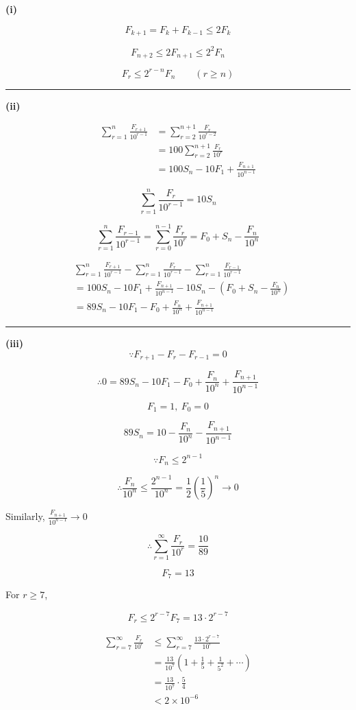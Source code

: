 \documentclass[12pt]{article}
\begin{document}
\newcommand{\ds}{\displaystyle}

\textbf{(i)}

$$F_{k+1}=F_k+F_{k-1}\leq 2F_k$$

$$F_{n+2}\leq 2F_{n+1}\leq 2^2F_n$$

$$F_r\leq 2^{r-n}F_n\qquad (r\geq n)$$

\bigskip\hrule\bigskip

\textbf{(ii)}

\begin{align*}
\sum_{r=1}^n\frac{F_{r+1}}{10^{r-1}}
&=\sum_{r=2}^{n+1}\frac{F_r}{10^{r-2}}\\
&=100\sum_{r=2}^{n+1}\frac{F_r}{10^r}\\
&=100S_n-10F_1+\frac{F_{n+1}}{10^{n-1}}
\end{align*}

$$\sum_{r=1}^n\frac{F_r}{10^{r-1}}=10S_n$$

$$\sum_{r=1}^n\frac{F_{r-1}}{10^{r-1}}=\sum_{r=0}^{n-1}\frac{F_r}{10^r}=F_0+S_n-\frac{F_n}{10^n}$$

\begin{align*}
&\sum_{r=1}^n\frac{F_{r+1}}{10^{r-1}}
-\sum_{r=1}^n\frac{F_r}{10^{r-1}}
-\sum_{r=1}^n\frac{F_{r-1}}{10^{r-1}}\\
&=100S_n-10F_1+\frac{F_{n+1}}{10^{n-1}}
-10S_n-\left(F_0+S_n-\frac{F_n}{10^n}\right)\\
&=89S_n-10F_1-F_0+\frac{F_n}{10^n}+\frac{F_{n+1}}{10^{n-1}}
\end{align*}

\bigskip\hrule\bigskip

\textbf{(iii)}
$$\because F_{r+1}-F_r-F_{r-1}=0$$

$$\therefore 0=89S_n-10F_1-F_0+\frac{F_n}{10^n}+\frac{F_{n+1}}{10^{n-1}}$$

$$F_1=1,\  F_0=0$$

$$89S_n=10-\frac{F_n}{10^n}-\frac{F_{n+1}}{10^{n-1}}$$

$$\because F_n\leq 2^{n-1}$$

$$\therefore \frac{F_n}{10^n}\leq \frac{2^{n-1}}{10^n}=\frac12\left(\frac15\right)^n\to0$$

Similarly, $\ds \frac{F_{n+1}}{10^{n-1}}\to0$

$$\therefore \sum_{r=1}^{\infty}\frac{F_r}{10^r}=\frac{10}{89}$$

$$F_7=13$$

For $r\geq7$,

$$F_r\leq 2^{r-7}F_7=13\cdot 2^{r-7}$$

\begin{align*}
\sum_{r=7}^{\infty}\frac{F_r}{10^r}
&\leq \sum_{r=7}^{\infty}\frac{13\cdot2^{r-7}}{10^r}\\
&=\frac{13}{10^7}\left(1+\frac15+\frac1{5^2}+\cdots\right)\\
&=\frac{13}{10^7}\cdot\frac54\\
&<2\times10^{-6}
\end{align*}
\end{document}
